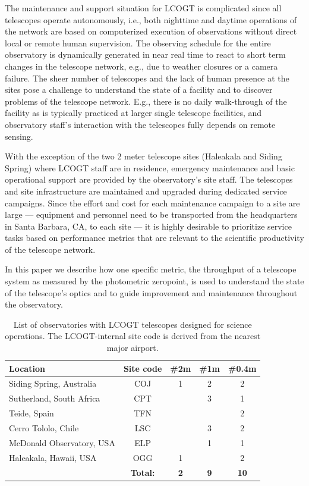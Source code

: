 \documentclass[]{spieman}
\begin{document}
The maintenance and support situation for LCOGT is complicated since all telescopes operate
autonomously, i.e., both nighttime and daytime operations of the network are based on computerized
execution of observations without direct local or remote human supervision. The observing schedule
for the entire observatory is dynamically generated in near real time to react to short term changes
in the telescope network\cite{saunders2014}, e.g., due to weather closures or a camera failure. The
sheer number of telescopes and the lack of human presence at the sites pose a challenge to
understand the state of a facility  and to discover problems of the telescope network. E.g., there
is no daily walk-through of the facility as is typically practiced at larger single telescope
facilities, and observatory staff's interaction with the telescopes fully depends on remote sensing.

With the exception of the two 2 meter telescope sites (Haleakala and Siding Spring) where LCOGT
staff are in residence, emergency maintenance and basic operational support are provided by the
observatory's site staff. The telescopes and site infrastructure are maintained and upgraded during
dedicated service campaigns. Since the effort and cost for each maintenance campaign to a site are
large --- equipment and personnel need to be transported from the headquarters in Santa Barbara, CA,
to each site --- it is highly desirable to prioritize service tasks based on performance metrics
that are relevant to the scientific productivity of the telescope network.


In this paper we describe how one specific metric, the throughput of a telescope system as measured
by the photometric zeropoint, is used to understand the state of the
telescope's optics and to guide improvement and maintenance throughout the observatory.


\begin{table}[h]
\centering
\begin{tabular} {|l|c|ccc|} \hline
Location                  & Site code & \#2m & \#1m & \#0.4m \\ \hline
Siding Spring, Australia & COJ & 1 & 2 & 2  \\
Sutherland, South Africa  & CPT &   & 3 & 1 \\
Teide, Spain              & TFN &   &   & 2 \\
Cerro Tololo, Chile       & LSC &   & 3 & 2 \\
McDonald Observatory, USA & ELP &   & 1 & 1\\
Haleakala, Hawaii, USA    & OGG & 1 &   & 2 \\\hline
                       &   \bf Total:  & \bf 2 & \bf 9 & \bf 10 \\ \hline
\end{tabular}
\vspace{1ex}
\caption{\label{tab_sites} List of observatories with LCOGT telescopes designed for science
operations. The LCOGT-internal site code is derived from the nearest major airport. }
\end{table}
\end{document}
